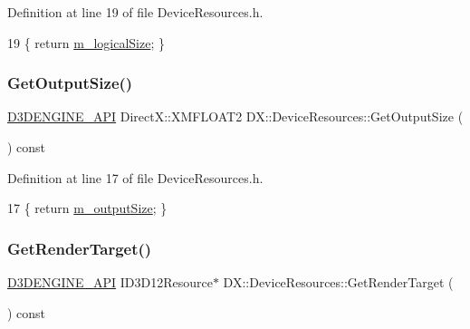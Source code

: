 Definition at line 19 of file Device\+Resources.\+h.


\begin{DoxyCode}
19 \{ \textcolor{keywordflow}{return} \mbox{\hyperlink{class_d_x_1_1_device_resources_a4689509084ecb52b9edf0f6e4ed886d9}{m\_logicalSize}}; \}
\end{DoxyCode}
\mbox{\label{class_d_x_1_1_device_resources_afa4a123452c35ff6208aa97ecbb8a725}} 
\subsubsection{\texorpdfstring{Get\+Output\+Size()}{GetOutputSize()}}
{\footnotesize\ttfamily \mbox{\hyperlink{stdafx_8h_a8ee2d990c5dfba7794dd2b60741d7722}{D3\+D\+E\+N\+G\+I\+N\+E\+\_\+\+A\+PI}} Direct\+X\+::\+X\+M\+F\+L\+O\+A\+T2 D\+X\+::\+Device\+Resources\+::\+Get\+Output\+Size (\begin{DoxyParamCaption}{ }\end{DoxyParamCaption}) const\hspace{0.3cm}{\ttfamily [inline]}}



Definition at line 17 of file Device\+Resources.\+h.


\begin{DoxyCode}
17 \{ \textcolor{keywordflow}{return} \mbox{\hyperlink{class_d_x_1_1_device_resources_aa102e231efe8bb03f3a91728f8477d08}{m\_outputSize}}; \}
\end{DoxyCode}
\mbox{\label{class_d_x_1_1_device_resources_a8dd65cfba90dd43be6b43328985d6f75}} 
\subsubsection{\texorpdfstring{Get\+Render\+Target()}{GetRenderTarget()}}
{\footnotesize\ttfamily \mbox{\hyperlink{stdafx_8h_a8ee2d990c5dfba7794dd2b60741d7722}{D3\+D\+E\+N\+G\+I\+N\+E\+\_\+\+A\+PI}} I\+D3\+D12\+Resource$\ast$ D\+X\+::\+Device\+Resources\+::\+Get\+Render\+Target (\begin{DoxyParamCaption}{ }\end{DoxyParamCaption}) const\hspace{0.3cm}{\ttfamily [inline]}}



